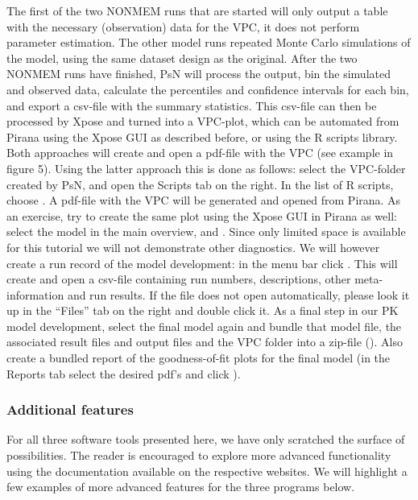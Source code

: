 The first of the two NONMEM runs that are started will only output a
table with the necessary (observation) data for the VPC, it does not
perform parameter estimation. The other model runs repeated Monte
Carlo simulations of the model, using the same dataset design as the
original. After the two NONMEM runs have finished, PsN will process
the output, bin the simulated and observed data, calculate the
percentiles and confidence intervals for each bin, and export a
csv-file with the summary statistics. This csv-file can then be
processed by Xpose and turned into a VPC-plot, which can be automated
from Pirana using the Xpose GUI as described before, or using the R
scripts library. Both approaches will create and open a pdf-file with
the VPC (see example in figure 5). Using the latter approach this is
done as follows: select the VPC-folder created by PsN, and open the
Scripts tab on the right. In the list of R scripts, choose . A pdf-file with the VPC
will be generated and opened from Pirana. As an exercise, try to
create the same plot using the Xpose GUI in Pirana as well: select the
model in the main overview, and . Since only limited space is available for
this tutorial we will not demonstrate other diagnostics. We will
however create a run record of the model development: in the menu bar
click . This will create and open a csv-file containing run
numbers, descriptions, other meta-information and run results. If the
file does not open automatically, please look it up in the “Files” tab
on the right and double click it. As a final step in our PK model
development, select the final model again and bundle that model file,
the associated result files and output files and the VPC folder into a
zip-file (). Also create a bundled report of the goodness-of-fit
plots for the final model (in the Reports tab select the desired pdf’s
and click ). 

\subsubsection{Additional features}
For all three software tools presented here, we have only scratched
the surface of possibilities. The reader is encouraged to explore more
advanced functionality using the documentation available on the
respective websites. We will highlight a few examples of more advanced
features for the three programs below.

